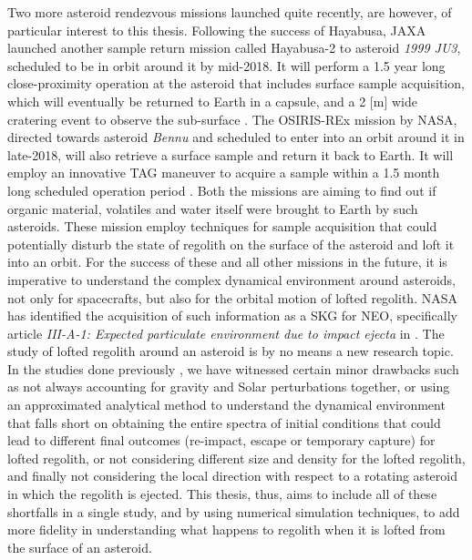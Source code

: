 Two more asteroid rendezvous missions launched quite recently, are however, of particular interest to this thesis. Following the success of Hayabusa, \gls{JAXA} launched another sample return mission called Hayabusa-2 to asteroid \textit{1999 JU3}, scheduled to be in orbit around it by mid-2018. It will perform a 1.5 year long close-proximity operation at the asteroid that includes surface sample acquisition, which will eventually be returned to Earth in a capsule, and a 2 [m] wide cratering event to observe the sub-surface \parencite{TsudaHayabusa2SystemDesign}. The \gls{OSIRIS-REx} mission by \gls{NASA}, directed towards asteroid \textit{Bennu} and scheduled to enter into an orbit around it in late-2018, will also retrieve a surface sample and return it back to Earth. It will employ an innovative \gls{TAG} maneuver to acquire a sample within a 1.5 month long scheduled operation period \parencite{berry2013osiris}. Both the missions are aiming to find out if organic material, volatiles and water itself were brought to Earth by such asteroids. These mission employ techniques for sample acquisition that could potentially disturb the state of regolith on the surface of the asteroid and loft it into an orbit. For the success of these and all other missions in the future, it is imperative to understand the complex dynamical environment around asteroids, not only for spacecrafts, but also for the orbital motion of lofted regolith. \gls{NASA} has identified the acquisition of such information as a \gls{SKG} for \gls{NEO}, specifically article \textit{III-A-1: Expected particulate environment due to impact ejecta} in \cite{nasa_skg}.
%
\newline\newline
%
The study of lofted regolith around an asteroid is by no means a new research topic. In the studies done previously \parencite{richter1995stability,lee1996dust,scheeres1996orbits,scheeres2000ejecta,korycansky2004_impactEjecta,yarnoz2014passive}, we have witnessed certain minor drawbacks such as not always accounting for gravity and Solar perturbations together, or using an approximated analytical method to understand the dynamical environment that falls short on obtaining the entire spectra of initial conditions that could lead to different final outcomes (re-impact, escape or temporary capture) for lofted regolith, or not considering different size and density for the lofted regolith, and finally not considering the local direction with respect to a rotating asteroid in which the regolith is ejected. This thesis, thus, aims to include all of these shortfalls in a single study, and by using numerical simulation techniques, to add more fidelity in understanding what happens to regolith when it is lofted from the surface of an asteroid.
